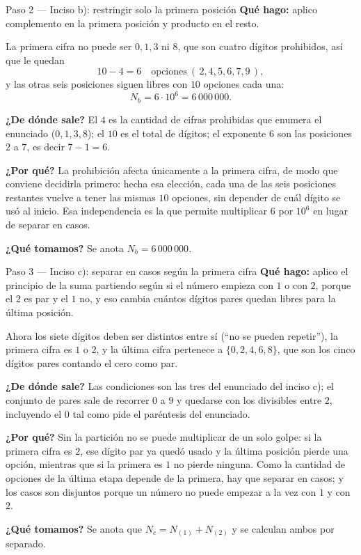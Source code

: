 \documentclass[11pt]{article}
\begin{document}
\begin{paso}{Paso 2 --- Inciso b): restringir solo la primera posición}
\textbf{Qué hago:} aplico complemento en la primera posición y producto en el resto.

La primera cifra no puede ser $0,1,3$ ni $8$, que son cuatro dígitos prohibidos, así que le quedan
\[
  10-4=6 \quad\text{opciones}\ (\,2,4,5,6,7,9\,),
\]
y las otras seis posiciones siguen libres con $10$ opciones cada una:
\[
  N_b = 6\cdot 10^{6} = 6\,000\,000 .
\]

\textbf{¿De dónde sale?} El $4$ es la cantidad de cifras prohibidas que enumera el enunciado ($0,1,3,8$); el $10$ es el total de dígitos; el exponente $6$ son las posiciones $2$ a $7$, es decir $7-1=6$.

\textbf{¿Por qué?} La prohibición afecta únicamente a la primera cifra, de modo que conviene decidirla primero: hecha esa elección, cada una de las seis posiciones restantes vuelve a tener las mismas $10$ opciones, sin depender de cuál dígito se usó al inicio. Esa independencia es la que permite multiplicar $6$ por $10^6$ en lugar de separar en casos.

\textbf{¿Qué tomamos?} Se anota $N_b=6\,000\,000$.
\end{paso}

\begin{paso}{Paso 3 --- Inciso c): separar en casos según la primera cifra}
\textbf{Qué hago:} aplico el principio de la suma partiendo según si el número empieza con $1$ o con $2$, porque el $2$ es par y el $1$ no, y eso cambia cuántos dígitos pares quedan libres para la última posición.

Ahora los siete dígitos deben ser distintos entre sí (``no se pueden repetir''), la primera cifra es $1$ o $2$, y la última cifra pertenece a $\{0,2,4,6,8\}$, que son los cinco dígitos pares contando el cero como par.

\textbf{¿De dónde sale?} Las condiciones son las tres del enunciado del inciso c); el conjunto de pares sale de recorrer $0$ a $9$ y quedarse con los divisibles entre $2$, incluyendo el $0$ tal como pide el paréntesis del enunciado.

\textbf{¿Por qué?} Sin la partición no se puede multiplicar de un solo golpe: si la primera cifra es $2$, ese dígito par ya quedó usado y la última posición pierde una opción, mientras que si la primera es $1$ no pierde ninguna. Como la cantidad de opciones de la última etapa depende de la primera, hay que separar en casos; y los casos son disjuntos porque un número no puede empezar a la vez con $1$ y con $2$.

\textbf{¿Qué tomamos?} Se anota que $N_c = N_{(1)}+N_{(2)}$ y se calculan ambos por separado.
\end{paso}
\end{document}

